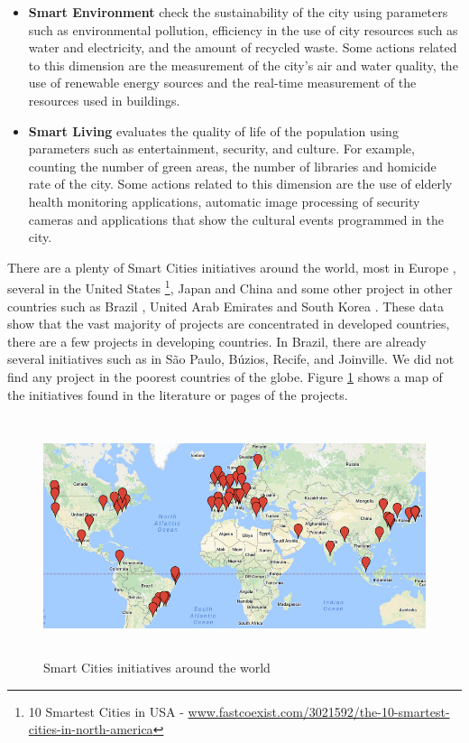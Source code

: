 \begin{itemize}
    \item \textbf{Smart Environment} check the sustainability of the city using parameters such as environmental pollution, efficiency in the use of city resources such as water and electricity, and the amount of recycled waste. Some actions related to this dimension are the measurement of the city's air and water quality, the use of renewable energy sources and the real-time measurement of the resources used in buildings.
    
    \item \textbf{Smart Living} evaluates the quality of life of the population using parameters such as entertainment, security, and culture. For example, counting the number of green areas, the number of libraries and homicide rate of the city. Some actions related to this dimension are the use of elderly health monitoring applications, automatic image processing of security cameras and applications that show the cultural events programmed in the city.

    
\end{itemize}

There are a plenty of Smart Cities initiatives around the world, most in Europe \cite{caragliu2011smart,manville2014mapping}, several in the United States \footnote{10 Smartest Cities in USA - \url{www.fastcoexist.com/3021592/the-10-smartest-cities-in-north-america}}, Japan and China \cite{liu2013smart} and some other project in other countries such as Brazil \cite{fortes2014deployment}, United Arab Emirates \cite{janajreh2013wind} and South Korea \cite{kshetri2014development}. These data show that the vast majority of projects are concentrated in developed countries, there are a few projects in developing countries. In Brazil, there are already several initiatives such as in S\~ao Paulo, B\'uzios, Recife, and Joinville. We did not find any project in the poorest countries of the globe. Figure \ref{figure:mapa} shows a map of the initiatives found in the literature or pages of the projects.

\begin{figure}[!htb]
\centering
\includegraphics[height=7cm]{figuras/mapaCidades}
\caption{Smart Cities initiatives around the world}
\label{figure:mapa}
\end{figure}

